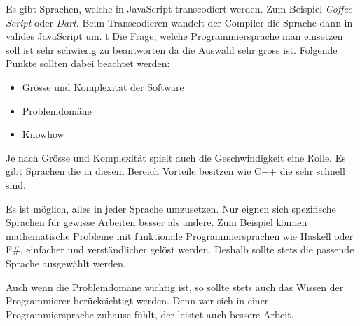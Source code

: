 Es gibt Sprachen, welche in JavaScript transcodiert werden. Zum Beispiel \textit{Coffee Script} oder \textit{Dart}. Beim Transcodieren wandelt der Compiler die Sprache dann in valides JavaScript um.
t
Die Frage, welche Programmiersprache man einsetzen soll ist sehr schwierig zu beantworten da die Auswahl sehr gross ist. Folgende Punkte sollten dabei beachtet werden:
\begin{itemize}
\item Grösse und Komplexität der Software
\item Problemdomäne
\item Knowhow
\end{itemize}
Je nach Grösse und Komplexität spielt auch die Geschwindigkeit eine Rolle. Es gibt Sprachen die in diesem Bereich Vorteile besitzen wie C++ die sehr schnell sind.

Es ist möglich, alles in jeder Sprache umzusetzen. Nur eignen sich spezifische Sprachen für gewisse Arbeiten besser als andere. Zum Beispiel können mathematische Probleme mit funktionale Programmiersprachen wie Haskell oder F\#, einfacher und verständlicher gelöst werden. Deshalb sollte stets die passende Sprache ausgewählt werden.

Auch wenn die Problemdomäne wichtig ist, so sollte stets auch das Wissen der Programmierer berücksichtigt werden. Denn wer sich in einer Programmiersprache zuhause fühlt, der leistet auch bessere Arbeit.

